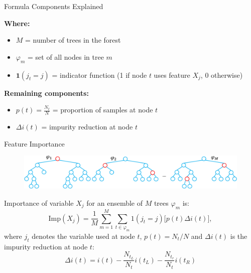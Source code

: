 \documentclass[10pt]{beamer}
\newcommand{\fitpic}[1]{\begin{adjustbox}{max width=\linewidth, max totalheight=0.78\textheight}#1\end{adjustbox}}
\begin{document}
\begin{frame}{Formula Components Explained}
\begin{keypointsbox}
\textbf{Where:}
\begin{itemize}
\item $M$ = number of trees in the forest
\item $\varphi_m$ = set of all nodes in tree $m$
\item $\mathbf{1}(j_t = j)$ = indicator function (1 if node $t$ uses feature $X_j$, 0 otherwise)
\end{itemize}
\end{keypointsbox}

\vspace{1cm}

\begin{examplebox}
\textbf{Remaining components:}
\begin{itemize}
\item $p(t) = \frac{N_t}{N}$ = proportion of samples at node $t$
\item $\Delta i(t)$ = impurity reduction at node $t$
\end{itemize}
\end{examplebox}
\end{frame}

\begin{frame}{Feature Importance\footnotemark}
  \begin{figure}
    \fitpic{\includegraphics[scale=0.4]{../assets/ensemble/diagrams/mdi.pdf}}
  \end{figure}
  Importance of variable $X_j$ for an ensemble of $M$ trees $\varphi_{m}$ is:
  \begin{equation*}
    \text{Imp}(X_j) = \frac{1}{M} \sum_{m=1}^M \sum_{t \in \varphi_{m}} 1(j_t = j) \Big[ p(t) \Delta i(t) \Big],
  \end{equation*}
  where $j_t$ denotes the variable used at node $t$, $p(t)=N_t/N$ and $\Delta i(t)$ is the impurity reduction at node $t$:
  \begin{equation*}
    \Delta i(t) = i(t) - \frac{N_{t_L}}{N_t} i(t_L) - \frac{N_{t_r}}{N_t} i(t_R)
  \end{equation*}

\end{frame}
\end{document}
